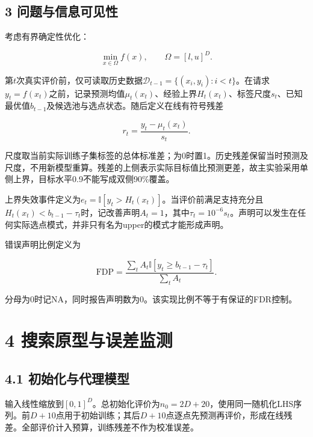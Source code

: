 \documentclass[11pt,a4paper]{article}
\begin{document}
\begin{samepage}

\hypertarget{ux95eeux9898ux4e0eux4fe1ux606fux53efux89c1ux6027}{%
\section{3
问题与信息可见性}\label{ux95eeux9898ux4e0eux4fe1ux606fux53efux89c1ux6027}}

考虑有界确定性优化：

\[
\min_{x\in\Omega} f(x),\qquad \Omega=[l,u]^D.
\]

\end{samepage}

第\(t\)次真实评价前，仅可读取历史数据\(\mathcal D_{t-1}=\{(x_i,y_i):i<t\}\)。在请求\(y_t=f(x_t)\)之前，记录预测均值\(\mu_t(x_t)\)、经验上界\(H_t(x_t)\)、标签尺度\(s_t\)、已知最优值\(b_{t-1}\)及候选池与选点状态。随后定义在线有符号残差

\[
r_t=\frac{y_t-\mu_t(x_t)}{s_t}.
\]

尺度取当前实际训练子集标签的总体标准差；为0时置1。历史残差保留当时预测及尺度，不用新模型重算。残差的上侧表示实际目标值比预测更差，故主实验采用单侧上界，目标水平0.9不能写成双侧90\%覆盖。

上界失效事件定义为\(e_t=\mathbb I[y_t>H_t(x_t)]\)。当评价前满足支持充分且\(H_t(x_t)<b_{t-1}-\tau_t\)时，记改善声明\(A_t=1\)，其中\(\tau_t=10^{-6}s_t\)。声明可以发生在任何实际选点模式，并非只有名为upper的模式才能形成声明。

错误声明比例定义为

\[
\mathrm{FDP}=\frac{\sum_t A_t\mathbb I[y_t\ge b_{t-1}-\tau_t]}{\sum_t A_t}.
\]

分母为0时记NA，同时报告声明数为0。该实现比例不等于有保证的FDR控制。

\hypertarget{ux641cux7d22ux539fux578bux4e0eux8befux5deeux76d1ux6d4b}{%
\section{4
搜索原型与误差监测}\label{ux641cux7d22ux539fux578bux4e0eux8befux5deeux76d1ux6d4b}}

\hypertarget{ux521dux59cbux5316ux4e0eux4ee3ux7406ux6a21ux578b}{%
\subsection{4.1
初始化与代理模型}\label{ux521dux59cbux5316ux4e0eux4ee3ux7406ux6a21ux578b}}

输入线性缩放到\([0,1]^D\)。总初始化评价为\(n_0=2D+20\)，使用同一随机化LHS序列。前\(D+10\)点用于初始训练；其后\(D+10\)点逐点先预测再评价，形成在线残差。全部评价计入预算，训练残差不作为校准误差。
\end{document}
